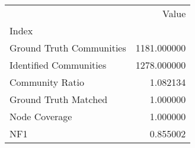\begin{tabular}{lr}
\toprule
{} &        Value \\
Index                    &              \\
\midrule
Ground Truth Communities &  1181.000000 \\
Identified Communities   &  1278.000000 \\
Community Ratio          &     1.082134 \\
Ground Truth Matched     &     1.000000 \\
Node Coverage            &     1.000000 \\
NF1                      &     0.855002 \\
\bottomrule
\end{tabular}
